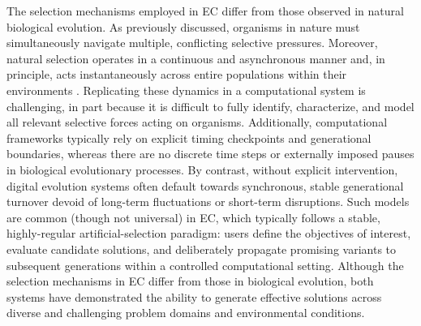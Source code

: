 The selection mechanisms employed in EC differ from those observed in natural biological evolution.  %
As previously discussed, organisms in nature must simultaneously navigate multiple, conflicting selective pressures.
Moreover, natural selection operates in a continuous and asynchronous manner and, in principle, acts instantaneously across entire populations within their environments \citep{lande1983measurement,shoval2012evolutionary}.
Replicating these dynamics in a computational system is challenging, in part because it is difficult to fully identify, characterize, and model all relevant selective forces acting on organisms.
Additionally, computational frameworks typically rely on explicit timing checkpoints and generational boundaries, whereas there are no discrete time steps or externally imposed pauses in biological evolutionary processes.
By contrast, without explicit intervention, digital evolution systems often default towards synchronous, stable generational turnover devoid of long-term fluctuations or short-term disruptions.
Such models are common (though not universal) in EC, which typically follows a stable, highly-regular artificial-selection paradigm: users define the objectives of interest, evaluate candidate solutions, and deliberately propagate promising variants to subsequent generations within a controlled computational setting.
Although the selection mechanisms in EC differ from those in biological evolution, both systems have demonstrated the ability to generate effective solutions across diverse and challenging problem domains and environmental conditions.
%
